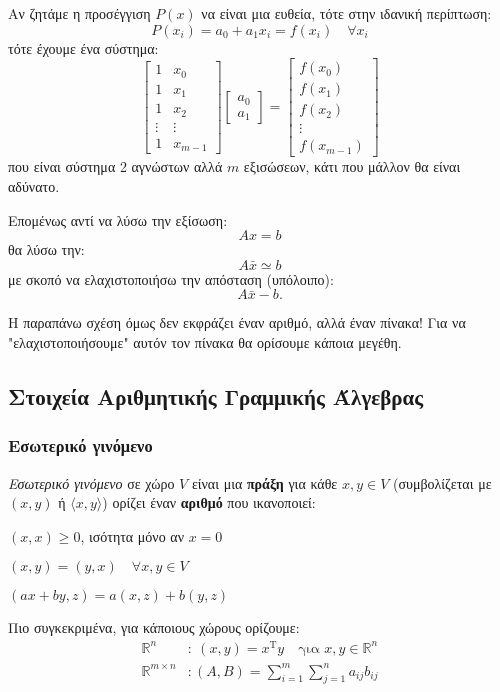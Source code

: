 \documentclass[11pt,a4paper,notitlepage,fleqn,final]{article}
\begin{document}
	Αν ζητάμε η προσέγγιση \( P(x) \) να είναι μια ευθεία, τότε στην
	ιδανική περίπτωση:
	\[
	P(x_i) = a_0 + a_1x_i = f(x_i) \quad \forall x_i
	\]
	τότε έχουμε ένα σύστημα:
	\[
	\left[
	\begin{matrix}
	1 & x_0 \\ 1 & x_1 \\ 1 & x_2 \\ \vdots & \vdots \\ 1 & x_{m-1}
	\end{matrix}
	\right] \left[
	\begin{matrix}
	a_0 \\ a_1
	\end{matrix}
	\right] = \left[
	\begin{matrix}
	f(x_0) \\ f(x_1) \\ f(x_2) \\ \vdots \\ f(x_{m-1})
	\end{matrix}
	\right]
	\]
	που είναι σύστημα 2 αγνώστων αλλά \( m \) εξισώσεων, κάτι που μάλλον
	θα είναι αδύνατο.

	Επομένως αντί να λύσω την εξίσωση:
	\[
	Ax = b
	\]
	θα λύσω την:
	\[
	A\bar x \simeq b
	\]
	με σκοπό να ελαχιστοποιήσω την απόσταση (υπόλοιπο):
	\[
	A\bar x -b.
	\]

	Η παραπάνω σχέση όμως δεν εκφράζει έναν αριθμό, αλλά έναν πίνακα!
	Για να "ελαχιστοποιήσουμε" αυτόν τον πίνακα θα ορίσουμε κάποια
	μεγέθη.

	\subsection{Στοιχεία Αριθμητικής Γραμμικής Άλγεβρας}
	\subsubsection{Εσωτερικό γινόμενο}
	\textit{Εσωτερικό γινόμενο} σε χώρο \( V \) είναι μια \textbf{πράξη}
	για κάθε \( x,y \in V \)
	(συμβολίζεται με \( (x,y) \) ή \( \langle x,y \rangle \))
	ορίζει έναν \textbf{αριθμό} που ικανοποιεί:
	\begin{enumroman}
		\item \( (x,x) \geq 0 \), ισότητα μόνο αν \( x=0 \)
		\item \( (x,y) = (y,x) \quad \forall x,y\in V \)
		\item \( (ax+by,z) = a(x,z)+b(y,z) \)
	\end{enumroman}

	Πιο συγκεκριμένα, για κάποιους χώρους ορίζουμε:
	\begin{align*}
	\mathbb R^n &: \ (x,y) = x^{\mathrm T}y \quad
	\text{για } x,y \in \mathbb R^n
	\\
	\mathbb R^{m\times n} &: (A,B) =
	\sum_{i=1}^{m}\sum_{j=1}^{n} a_{ij}b_{ij}
	\end{align*}
\end{document}
